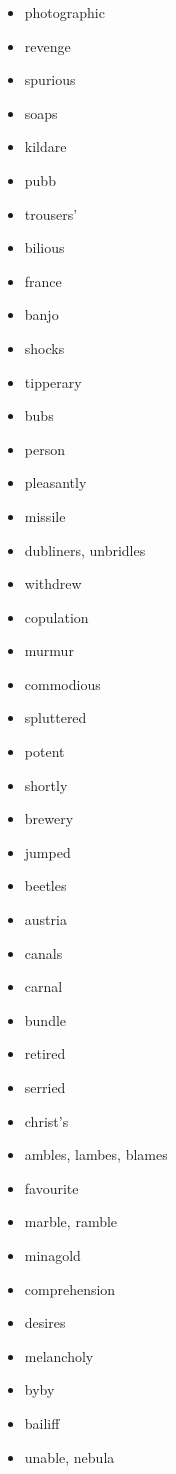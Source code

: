 \documentclass{article}
\begin{document}
\begin{itemize}
    \item photographic
    \item revenge
    \item spurious
    \item soaps
    \item kildare
    \item pubb
    \item trousers'
    \item bilious
    \item france
    \item banjo
    \item shocks
    \item tipperary
    \item bubs
    \item person
    \item pleasantly
    \item missile
    \item dubliners, unbridles
    \item withdrew
    \item copulation
    \item murmur
    \item commodious
    \item spluttered
    \item potent
    \item shortly
    \item brewery
    \item jumped
    \item beetles
    \item austria
    \item canals
    \item carnal
    \item bundle
    \item retired
    \item serried
    \item christ's
    \item ambles, lambes, blames
    \item favourite
    \item marble, ramble
    \item minagold
    \item comprehension
    \item desires
    \item melancholy
    \item byby
    \item bailiff
    \item unable, nebula

\end{itemize}
\end{document}
